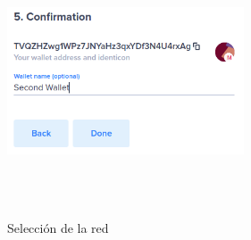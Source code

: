 \begin{figure}[h]
	\centering
	\includegraphics[width=7cm,height=8cm]{figuras/wallet_15.png}
	\caption{Selección de la red}
	\label{fig:wallet-15}
\end{figure}


















